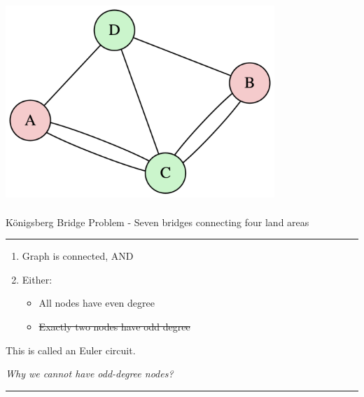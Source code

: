 \documentclass[
  letterpaper,
  DIV=11,
  numbers=noendperiod,
  oneside]{scrartcl}
\providecommand{\tightlist}{%
  \setlength{\itemsep}{0pt}\setlength{\parskip}{0pt}}
\begin{document}
\includegraphics[width=4in,height=3in]{slide01_files/figure-latex/dot-figure-6.png}

Königsberg Bridge Problem - Seven bridges connecting four land areas

\begin{center}\rule{0.5\linewidth}{0.5pt}\end{center}

\begin{tcolorbox}[enhanced jigsaw, opacityback=0, bottomtitle=1mm, toptitle=1mm, breakable, rightrule=.15mm, colbacktitle=quarto-callout-tip-color!10!white, toprule=.15mm, coltitle=black, colback=white, titlerule=0mm, opacitybacktitle=0.6, title=\textcolor{quarto-callout-tip-color}{\faLightbulb}\hspace{0.5em}{Answer:}, arc=.35mm, leftrule=.75mm, bottomrule=.15mm, left=2mm, colframe=quarto-callout-tip-color-frame]

\begin{enumerate}
\def\labelenumi{\arabic{enumi}.}
\item
  Graph is connected, AND
\item
  Either:

  \begin{itemize}
  \tightlist
  \item
    All nodes have even degree
  \item
    \st{Exactly two nodes have odd degree}
  \end{itemize}
\end{enumerate}

This is called an {Euler circuit}.

\end{tcolorbox}

\emph{Why we cannot have odd-degree nodes?}

\begin{center}\rule{0.5\linewidth}{0.5pt}\end{center}
\end{document}
